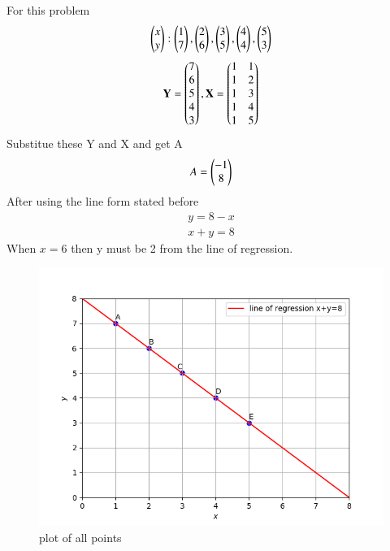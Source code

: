 \documentclass[journal,12pt,twocolumn]{IEEEtran}
\begin{document}
	For this problem 
	\begin{align}
		\begin{pmatrix}x \\y \end{pmatrix}:
	\begin{pmatrix}1 \\7 \end{pmatrix},
	\begin{pmatrix}2 \\6 \end{pmatrix},
	\begin{pmatrix}3 \\5 \end{pmatrix},
    \begin{pmatrix}4 \\4 \end{pmatrix},
    \begin{pmatrix}5 \\3 \end{pmatrix}
	\end{align}
\begin{align}
	\mathbf{Y}=\begin{pmatrix}7\\6\\5\\4\\3\end{pmatrix},
	\mathbf{X}=\begin{pmatrix}1&1\\1&2\\1&3\\1&4\\1&5\end{pmatrix}
\end{align}
Substitue these Y and X and get A 
\begin{align}
	A=\begin{pmatrix}-1\\8\end{pmatrix}
\end{align}
	After using the line form stated before
	\begin{align}
		y=8-x\\
		x+y=8
	\end{align}
	When $x=6$ then y must be 2 from the line of regression.
	
	\begin{figure}[h!]
		\centering
		\includegraphics[width=\columnwidth]{./figs/fig1.png}
		\caption{plot of all points}
		\label{Fig1}
	\end{figure}
	
\end{document}
